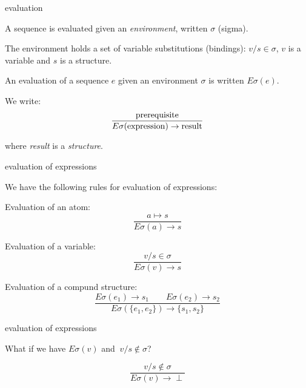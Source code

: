 \begin{frame}{evaluation}

A sequence is evaluated given an {\em environment}, written $\sigma$ (sigma).

\pause\vspace{20pt}
The environment holds a set of variable substitutions (bindings):
$v/s \in \sigma$, $v$ is a variable and $s$ is a structure.

\pause\vspace{20pt} 
An evaluation of a sequence $e$ given an environment
$\sigma$ is written $E\sigma(e)$. 

\pause\vspace{20pt}
We write:
\vspace{20pt}
$$\frac{{\rm prerequisite}}{E\sigma({\rm expression}) \rightarrow {\rm result}}$$

\vspace{20pt}
where {\em result} is a {\em structure}.

\end{frame}


\begin{frame}{evaluation of expressions}

We have the following rules for evaluation of expressions:

\vspace{10pt}\pause Evaluation of an atom: $$\frac{a \mapsto s}{E\sigma(a) \rightarrow s}$$

\vspace{10pt}\pause Evaluation of a variable: $$\frac{v/s \in \sigma}{E\sigma(v) \rightarrow s}$$

\vspace{10pt}\pause Evaluation of a compund structure: $$\frac{ E\sigma(e_1) \rightarrow s_1 \qquad   E\sigma(e_2) \rightarrow s_2}{E\sigma(\lbrace e_1 , e_2\rbrace) \rightarrow \{s_1, s_2\}}$$
 
\end{frame}

\begin{frame}{evaluation of expressions}

  \vspace{20pt} What if we have $E\sigma(v)$ and $\ v/s \not\in \sigma$? 

  \pause $$\frac{ v/s \not\in \sigma}{E\sigma(v) \rightarrow  \perp}$$

\end{frame}

